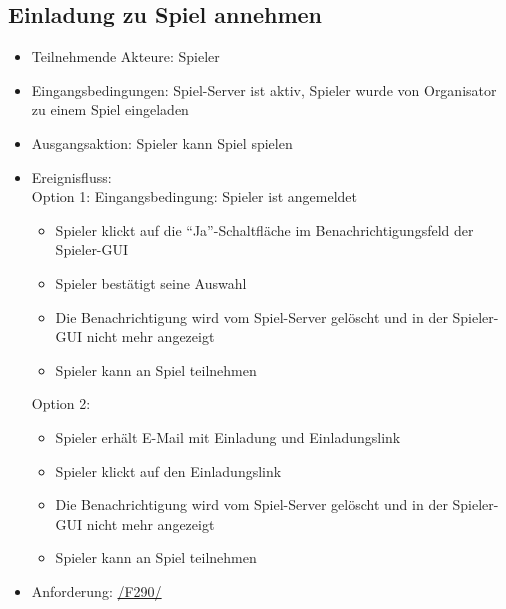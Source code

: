 \documentclass[a4paper]{scrreprt}
\begin{document}
    \subsection{Einladung zu Spiel annehmen}
    \begin{itemize}
        \item Teilnehmende Akteure: \Gls{Spieler}

        \item Eingangsbedingungen: \Gls{Spiel-Server} ist aktiv, Spieler wurde von \Gls{Organisator} zu einem Spiel eingeladen
        \item Ausgangsaktion: \Gls{Spieler} kann \Gls{Spiel} spielen
        \item Ereignisfluss:\\
        Option 1: 
        Eingangsbedingung: \Gls{Spieler} ist angemeldet
        \begin{itemize}
            \item \Gls{Spieler} klickt auf die \enquote{Ja}-Schaltfläche im Benachrichtigungsfeld der Spieler-GUI
            \item \Gls{Spieler} bestätigt seine Auswahl
            \item Die Benachrichtigung wird vom \Gls{Spiel-Server} gelöscht und in der Spieler-GUI nicht mehr angezeigt
            \item \Gls{Spieler} kann an \Gls{Spiel} teilnehmen
        \end{itemize}
        Option 2: 
        \begin{itemize}
            \item \Gls{Spieler} erhält E-Mail mit Einladung und Einladungslink
            \item \Gls{Spieler} klickt auf den Einladungslink
            \item Die Benachrichtigung wird vom \Gls{Spiel-Server} gelöscht und in der Spieler-GUI nicht mehr angezeigt
            \item \Gls{Spieler} kann an \Gls{Spiel} teilnehmen
        \end{itemize}

        \item Anforderung: \hyperlink{F290}{/F290/}
    \end{itemize}
\end{document}
